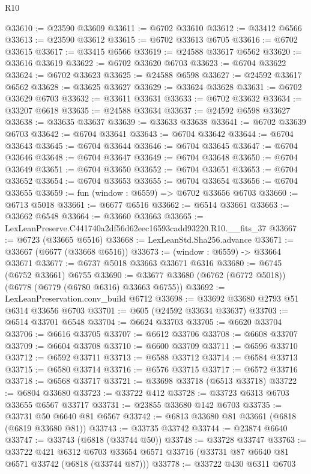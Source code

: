 \begin{lexlean}{R10}
\begin{coremodule}
@33610 := @23590 @33609
@33611 := @6702 @33610
@33612 := @33412 @6566
@33613 := @23590 @33612
@33615 := @6702 @33613 @6705
@33616 := @6702 @33615
@33617 := @33415 @6566
@33619 := @24588 @33617 @6562
@33620 := @33616 @33619
@33622 := @6702 @33620 @6703
@33623 := @6704 @33622
@33624 := @6702 @33623
@33625 := @24588 @6598
@33627 := @24592 @33617 @6562
@33628 := @33625 @33627
@33629 := @33624 @33628
@33631 := @6702 @33629 @6703
@33632 := @33611 @33631
@33633 := @6702 @33632
@33634 := @33207 @6618
@33635 := @24588 @33634
@33637 := @24592 @6598 @33627
@33638 := @33635 @33637
@33639 := @33633 @33638
@33641 := @6702 @33639 @6703
@33642 := @6704 @33641
@33643 := @6704 @33642
@33644 := @6704 @33643
@33645 := @6704 @33644
@33646 := @6704 @33645
@33647 := @6704 @33646
@33648 := @6704 @33647
@33649 := @6704 @33648
@33650 := @6704 @33649
@33651 := @6704 @33650
@33652 := @6704 @33651
@33653 := @6704 @33652
@33654 := @6704 @33653
@33655 := @6704 @33654
@33656 := @6704 @33655
@33659 := fun (window : @6559) => @6702 @33656 @6703
@33660 := @6713 @5018
@33661 := @6677 @6516
@33662 := @6514 @33661
@33663 := @33662 @6548
@33664 := @33660 @33663
@33665 := LexLeanPreserve.C441740a2df56d62eec16593cadd93220.R10.__fits_37
@33667 := @6723 (@33665 @6516)
@33668 := LexLeanStd.Sha256.advance
@33671 := @33667 (@6677 (@33668 @6516))
@33673 := (window : @6559) -> @33664 @33671
@33677 := @6737 @5018 @33663 @33671 @6316
@33680 := @6745 (@6752 @33661) @6755
@33690 := @33677 @33680 (@6762 (@6772 @5018)) (@6778 (@6779 (@6780 @6316) @33663 @6755))
@33692 := LexLeanPreservation.conv_build @6712
@33698 := @33692 @33680 @2793 @51 @6314 @33656 @6703
@33701 := @605 (@24592 @33634 @33637)
@33703 := @6514 @33701 @6548
@33704 := @6624 @33703
@33705 := @6620 @33704
@33706 := @6616 @33705
@33707 := @6612 @33706
@33708 := @6608 @33707
@33709 := @6604 @33708
@33710 := @6600 @33709
@33711 := @6596 @33710
@33712 := @6592 @33711
@33713 := @6588 @33712
@33714 := @6584 @33713
@33715 := @6580 @33714
@33716 := @6576 @33715
@33717 := @6572 @33716
@33718 := @6568 @33717
@33721 := @33698 @33718 (@6513 @33718)
@33722 := @6804 @33680
@33723 := @33722 @412
@33728 := @33723 @6313 @6703 @33655 @6567 @33717
@33731 := @23855 @33680 @142 @6703
@33735 := @33731 @50 @6640 @81 @6567
@33742 := @6813 @33680 @81 @33661 (@6818 (@6819 @33680 @81))
@33743 := @33735 @33742
@33744 := @23874 @6640
@33747 := @33743 (@6818 (@33744 @50))
@33748 := @33728 @33747
@33763 := @33722
    @421
    @6312
    @6703
    @33654
    @6571
    @33716
    (@33731 @87 @6640 @81 @6571 @33742 (@6818 (@33744 @87)))
@33778 := @33722
    @430
    @6311
    @6703

\end{coremodule}
\end{lexlean}
